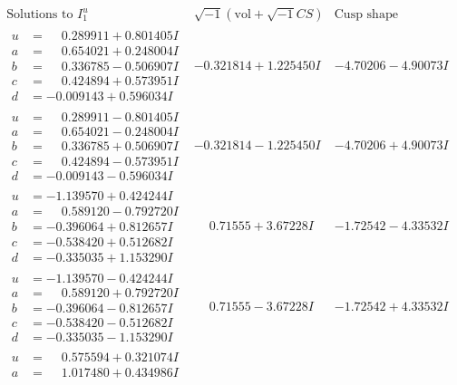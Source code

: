 \documentclass[1p]{elsarticle_modified}
\theoremstyle{definition}
\newcommand{\I}{\sqrt{-1}}
\begin{document}
$$\begin{array}{c|c|c}  
\text{Solutions to }I^u_{1}& \I (\text{vol} + \sqrt{-1}CS) & \text{Cusp shape}\\
 \hline 
\begin{aligned}
u &= \phantom{-}0.289911 + 0.801405 I \\
a &= \phantom{-}0.654021 + 0.248004 I \\
b &= \phantom{-}0.336785 - 0.506907 I \\
c &= \phantom{-}0.424894 + 0.573951 I \\
d &= -0.009143 + 0.596034 I\end{aligned}
 & -0.321814 + 1.225450 I & -4.70206 - 4.90073 I \\ \hline\begin{aligned}
u &= \phantom{-}0.289911 - 0.801405 I \\
a &= \phantom{-}0.654021 - 0.248004 I \\
b &= \phantom{-}0.336785 + 0.506907 I \\
c &= \phantom{-}0.424894 - 0.573951 I \\
d &= -0.009143 - 0.596034 I\end{aligned}
 & -0.321814 - 1.225450 I & -4.70206 + 4.90073 I \\ \hline\begin{aligned}
u &= -1.139570 + 0.424244 I \\
a &= \phantom{-}0.589120 - 0.792720 I \\
b &= -0.396064 + 0.812657 I \\
c &= -0.538420 + 0.512682 I \\
d &= -0.335035 + 1.153290 I\end{aligned}
 & \phantom{-}0.71555 + 3.67228 I & -1.72542 - 4.33532 I \\ \hline\begin{aligned}
u &= -1.139570 - 0.424244 I \\
a &= \phantom{-}0.589120 + 0.792720 I \\
b &= -0.396064 - 0.812657 I \\
c &= -0.538420 - 0.512682 I \\
d &= -0.335035 - 1.153290 I\end{aligned}
 & \phantom{-}0.71555 - 3.67228 I & -1.72542 + 4.33532 I \\ \hline\begin{aligned}
u &= \phantom{-}0.575594 + 0.321074 I \\
a &= \phantom{-}1.017480 + 0.434986 I \\

\end{aligned}
\end{array}$$
\end{document}
